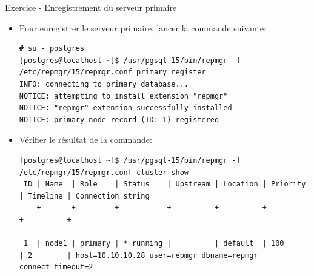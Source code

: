 
\begin{frame}[fragile]{Exercice - Enregistrement du serveur primaire}

   \begin{itemize}
      \item Pour enregistrer le serveur primaire, lancer la commande suivante:
\begin{tiny}
\begin{Verbatim}[commandchars=\\\{\}]
# su - postgres
[postgres@localhost ~]$ /usr/pgsql-15/bin/repmgr -f /etc/repmgr/15/repmgr.conf primary register                                                                                              
INFO: connecting to primary database...
NOTICE: attempting to install extension "repmgr"
NOTICE: "repmgr" extension successfully installed
NOTICE: primary node record (ID: 1) registered
\end{Verbatim}
\end{tiny}
      \item Vérifier le résultat de la commande:
\begin{tiny}
\begin{Verbatim}[commandchars=\\\{\}]
[postgres@localhost ~]$ /usr/pgsql-15/bin/repmgr -f /etc/repmgr/15/repmgr.conf cluster show
 ID | Name  | Role    | Status    | Upstream | Location | Priority | Timeline | Connection string                                           
----+-------+---------+-----------+----------+----------+----------+----------+--------------------------------------------------------------
 1  | node1 | primary | * running |          | default  | 100      | 2        | host=10.10.10.28 user=repmgr dbname=repmgr connect_timeout=2
\end{Verbatim}
\end{tiny}
   \end{itemize}

\begin{toile}
\end{toile}

\end{frame}


